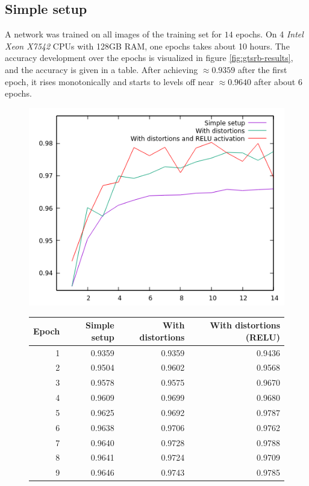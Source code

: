 \documentclass[11pt, a4paper]{article}
\begin{document}
\subsection{Simple setup}
\label{subsec:simplesetup}
A network was trained on all images of the training set for $14$ epochs. On 4 \emph{Intel Xeon X7542} CPUs with 128GB RAM, one epochs takes about 10 hours. The accuracy development over the epochs is visualized in figure \ref{fig:gtsrb-results}, and the accuracy is given in a table. After achieving $\approx 0.9359$ after the first epoch, it rises monotonically and starts to levels off near $\approx 0.9640$ after about 6 epochs.

\begin{figure}[h!]
	\centering
	\includegraphics{accuracy_plots/gtsrb_results}
	\begin{tabular}{|r|rrr|}
		\hline
		Epoch & Simple setup & With distortions & With distortions (RELU) \\
		\hline
		1 & 0.9359 & 0.9359 & 0.9436 \\
		2 & 0.9504 & 0.9602 & 0.9568 \\
		3 & 0.9578 & 0.9575 & 0.9670 \\
		4 & 0.9609 & 0.9699 & 0.9680 \\
		5 & 0.9625 & 0.9692 & 0.9787 \\
		6 & 0.9638 & 0.9706 & 0.9762 \\
		7 & 0.9640 & 0.9728 & 0.9788 \\
		8 & 0.9641 & 0.9724 & 0.9709 \\
		9 & 0.9646 & 0.9743 & 0.9785 \\

\end{tabular}
\end{figure}
\end{document}
